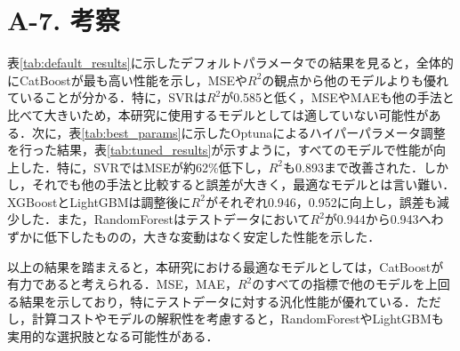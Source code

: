 \section*{A-7. 考察}
表\ref{tab:default_results}に示したデフォルトパラメータでの結果を見ると，全体的にCatBoostが最も高い性能を示し，MSEや$R^2$の観点から他のモデルよりも優れていることが分かる．特に，SVRは$R^2$が0.585と低く，MSEやMAEも他の手法と比べて大きいため，本研究に使用するモデルとしては適していない可能性がある．次に，表\ref{tab:best_params}に示したOptunaによるハイパーパラメータ調整を行った結果，表\ref{tab:tuned_results}が示すように，すべてのモデルで性能が向上した．特に，SVRではMSEが約62\%低下し，$R^2$も0.893まで改善された．しかし，それでも他の手法と比較すると誤差が大きく，最適なモデルとは言い難い．XGBoostとLightGBMは調整後に$R^2$がそれぞれ0.946，0.952に向上し，誤差も減少した．また，RandomForestはテストデータにおいて$R^2$が0.944から0.943へわずかに低下したものの，大きな変動はなく安定した性能を示した．

以上の結果を踏まえると，本研究における最適なモデルとしては，CatBoostが有力であると考えられる．MSE，MAE，$R^2$のすべての指標で他のモデルを上回る結果を示しており，特にテストデータに対する汎化性能が優れている．ただし，計算コストやモデルの解釈性を考慮すると，RandomForestやLightGBMも実用的な選択肢となる可能性がある．
